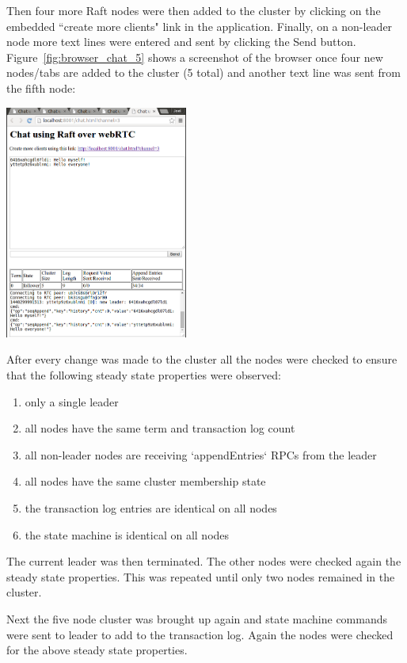 \documentclass[9pt]{extarticle}
\begin{document}
\begin{multicols}{2}
Then four more Raft nodes were then added to the cluster by clicking
on the embedded ``create more clients" link in the application.
Finally, on a non-leader node more text lines were entered and sent by
clicking the Send button. Figure~\ref{fig:browser_chat_5} shows
a screenshot of the browser once four new nodes/tabs are added to the
cluster (5 total) and another text line was sent from the fifth node:

\begin{center}
    \includegraphics[width=0.45\textwidth]{imgs/chat_5a.png}
    \label{fig:browser_chat_5}
\end{center}

After every change was made to the cluster all the nodes were checked
to ensure that the following steady state properties were observed:
\begin{enumerate}
\item only a single leader
\item all nodes have the same term and transaction log count
\item all non-leader nodes are receiving `appendEntries` RPCs from the leader
\item all nodes have the same cluster membership state
\item the transaction log entries are identical on all nodes
\item the state machine is identical on all nodes
\end{enumerate}

The current leader was then terminated. The other nodes were checked
again the steady state properties. This was repeated until only two
nodes remained in the cluster.

Next the five node cluster was brought up again and state machine
commands were sent to leader to add to the transaction log. Again the
nodes were checked for the above steady state properties.


\end{multicols}
\end{document}
